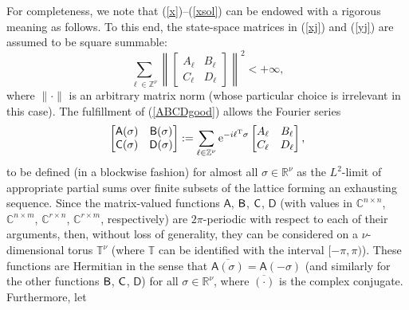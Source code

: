 \documentclass[letterpaper, 10pt, conference]{ieeeconf}  %
\def\mZ{\mathbb{Z}}    %
\def\mR{\mathbb{R}}    %
\def\mC{\mathbb{C}}    %
\def\rT{\mathrm{T}}        %
\def\re{\mathrm{e}}        %
\def\x{\times}
\def\sA{\mathsf{A}}
\def\sB{\mathsf{B}}
\def\sC{\mathsf{C}}
\def\sD{\mathsf{D}}
\def\sB{{\sf B}}
\def\sC{{\sf C}}
\def\mT{\mathbb{T}}
\def\mZ{\mathbb{Z}}
\begin{document}
For completeness, we note that (\ref{x})--(\ref{xsol}) can be endowed with a rigorous meaning as follows. To this end,
the state-space matrices in (\ref{xj}) and (\ref{yj}) are assumed to be square summable:
\begin{equation}
\label{ABCDgood}
    \sum_{\ell\in \mZ^\nu}
    \left\|
  \begin{bmatrix}
    A_\ell & B_\ell\\
    C_\ell & D_\ell
  \end{bmatrix}
    \right\|^2
    <+\infty,
\end{equation}
where $\|\cdot\|$ is an arbitrary matrix norm (whose particular choice is irrelevant in this case).  The fulfillment of (\ref{ABCDgood}) allows the Fourier series
\begin{equation}
\label{ABCD}
  \begin{bmatrix}
    \sA(\sigma) & \sB(\sigma)\\
    \sC(\sigma) & \sD(\sigma)
  \end{bmatrix}
  :=
  \sum_{\ell\in \mZ^\nu}
  \re^{-i\ell^{\rT}\sigma}
  \begin{bmatrix}
    A_\ell & B_\ell\\
    C_\ell & D_\ell
  \end{bmatrix},
\end{equation}
to be defined (in a blockwise fashion)
for almost all $\sigma \in \mR^\nu$ as the $L^2$-limit of appropriate partial sums over finite subsets of the lattice forming an exhausting sequence. Since the matrix-valued  functions $\sA$, $\sB$, $\sC$, $\sD$ (with values in $\mC^{n\x n}$, $\mC^{n\x m}$, $\mC^{r\x n}$, $\mC^{r\x m}$, respectively)
are $2\pi$-periodic with respect to each of their arguments, then, without loss of generality,  they can be considered on a $\nu$-dimensional torus $\mT^\nu$ (where $\mT$ can be  identified with the interval $[-\pi,\pi)$). These functions are Hermitian in the sense that $\overline{\sA(\sigma)} = \sA(-\sigma)$ (and similarly for the other functions $\sB$, $\sC$, $\sD$) for all $\sigma \in \mR^\nu$, where $\overline{(\cdot )}$ is the complex conjugate.  Furthermore, let
\end{document}
